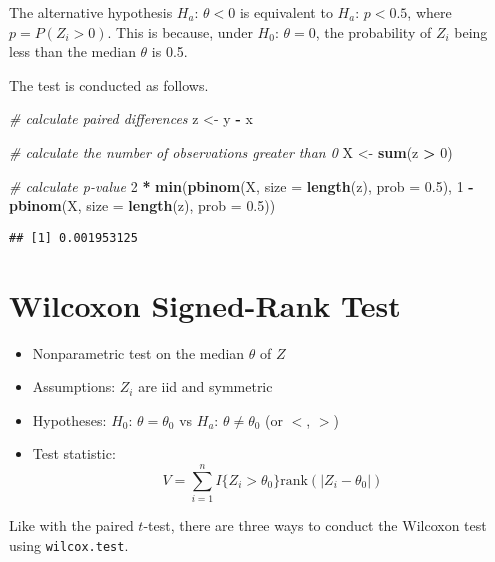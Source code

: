 \documentclass[
]{book}
\newenvironment{Shaded}{\begin{snugshade}}{\end{snugshade}}
\newcommand{\CommentTok}[1]{\textcolor[rgb]{0.56,0.35,0.01}{\textit{#1}}}
\newcommand{\DataTypeTok}[1]{\textcolor[rgb]{0.13,0.29,0.53}{#1}}
\newcommand{\DecValTok}[1]{\textcolor[rgb]{0.00,0.00,0.81}{#1}}
\newcommand{\FloatTok}[1]{\textcolor[rgb]{0.00,0.00,0.81}{#1}}
\newcommand{\KeywordTok}[1]{\textcolor[rgb]{0.13,0.29,0.53}{\textbf{#1}}}
\newcommand{\NormalTok}[1]{#1}
\newcommand{\OperatorTok}[1]{\textcolor[rgb]{0.81,0.36,0.00}{\textbf{#1}}}
\newcommand{\StringTok}[1]{\textcolor[rgb]{0.31,0.60,0.02}{#1}}
\providecommand{\tightlist}{%
  \setlength{\itemsep}{0pt}\setlength{\parskip}{0pt}}
\begin{document}
The alternative hypothesis \(H_a\): \(\theta < 0\)
is equivalent to \(H_a\): \(p < 0.5\), where \(p = P(Z_i > 0)\).
This is because, under \(H_0\): \(\theta = 0\), the probability of \(Z_i\) being less than the
median \(\theta\) is 0.5.

The test is conducted as follows.

\begin{Shaded}
\begin{Highlighting}[]
\CommentTok{# calculate paired differences}
\NormalTok{z <-}\StringTok{ }\NormalTok{y }\OperatorTok{-}\StringTok{ }\NormalTok{x}

\CommentTok{# calculate the number of observations greater than 0}
\NormalTok{X <-}\StringTok{ }\KeywordTok{sum}\NormalTok{(z }\OperatorTok{>}\StringTok{ }\DecValTok{0}\NormalTok{)}

\CommentTok{# calculate p-value}
\DecValTok{2} \OperatorTok{*}\StringTok{ }\KeywordTok{min}\NormalTok{(}\KeywordTok{pbinom}\NormalTok{(X, }\DataTypeTok{size =} \KeywordTok{length}\NormalTok{(z), }\DataTypeTok{prob =} \FloatTok{0.5}\NormalTok{),}
        \DecValTok{1} \OperatorTok{-}\StringTok{ }\KeywordTok{pbinom}\NormalTok{(X, }\DataTypeTok{size =} \KeywordTok{length}\NormalTok{(z), }\DataTypeTok{prob =} \FloatTok{0.5}\NormalTok{))}
\end{Highlighting}
\end{Shaded}

\begin{verbatim}
## [1] 0.001953125
\end{verbatim}

\hypertarget{wilcoxon-signed-rank-test}{%
\section{Wilcoxon Signed-Rank Test}\label{wilcoxon-signed-rank-test}}

\begin{itemize}
\tightlist
\item
  Nonparametric test on the median \(\theta\) of \(Z\)
\item
  Assumptions: \(Z_i\) are iid and symmetric
\item
  Hypotheses: \(H_0\): \(\theta = \theta_0\) vs \(H_a\): \(\theta \neq \theta_0\) (or \(<\), \(>\))
\item
  Test statistic: \[V = \sum_{i = 1}^n I\{Z_i > \theta_0\} \mathrm{rank}(|Z_i - \theta_0|)\]
\end{itemize}

Like with the paired \(t\)-test, there are three ways to conduct the Wilcoxon test
using \texttt{wilcox.test}.
\end{document}
